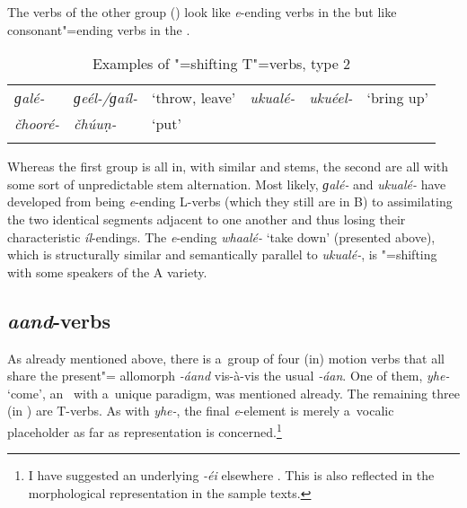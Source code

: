 The verbs of the other group () look like \textit{e}-ending verbs in the  but like consonant"=ending verbs in the . 


\begin{table} 
\caption{Examples of "=shifting T"=verbs, type 2}
\begin{tabularx}{\textwidth}{ Q l l Q Q l }
\lsptoprule
\textit{ɡalé-} &
\textit{ɡeél-/ɡaíl-} &
`throw, leave'{\protect\footnotemark} &
\textit{ukualé-} &
\textit{ukuéel-} &
`bring up'{\protect\footnotemark}\\
\textit{čhooré-} &
\textit{čhúuṇ-} &
`put' &
&
&
\\\lspbottomrule
\end{tabularx}
\label{tab:8-tas2}
\end{table}

\addtocounter{footnote}{-2}

Whereas the first group is all in, with similar  and  stems, the second are all  with some sort of unpredictable stem alternation. Most likely, \textit{ɡalé-} and \textit{ukualé-} have developed from being \textit{e}-ending L-verbs (which they still are in B) to assimilating the two identical segments adjacent to one another and thus losing their characteristic \textit{íl}-endings. The \textit{e}-ending  \textit{whaalé-} `take down' (presented above), which is structurally similar and semantically parallel to \textit{ukualé-}, is "=shifting with some speakers of the A variety. 


\subsection{\textit{aand}-verbs}
\label{subsec:8-3-8}


As already mentioned above, there is a~group of four (in) motion verbs that all share the present"= allomorph \textit{-áand} vis-à-vis the usual \textit{-áan}. One of them, \textit{yhe-} `come', an~ with a~unique paradigm, was mentioned already. The remaining three (in ) are T-verbs. As with \textit{yhe-}, the final \textit{e}-element is merely a~vocalic placeholder as far as representation is concerned.\footnote{I have suggested an underlying \textit{-éi} elsewhere \citep{liljegrenhaider2011,liljegrenhaider2015}. This is also reflected in the morphological representation in the sample texts.}


